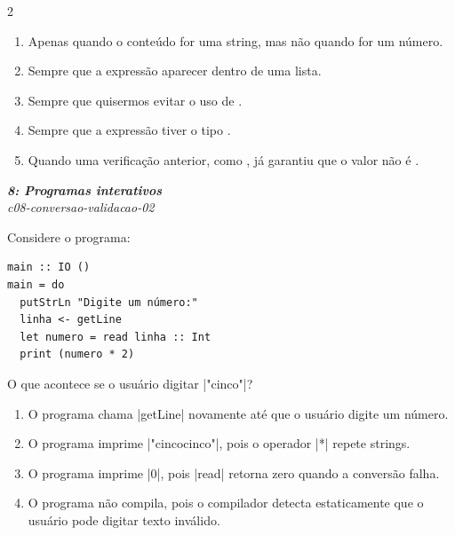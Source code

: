 \documentclass[a4paper,10pt,brazil]{article}
\begin{document}
\begin{multicols}{2}
\begin{enumerate}
  \item Apenas quando o conteúdo for uma string, mas não quando for um número.

  \item Sempre que a expressão aparecer dentro de uma lista.

  \item Sempre que quisermos evitar o uso de .

  \item Sempre que a expressão tiver o tipo .

  \item Quando uma verificação anterior, como , já garantiu que o valor não é .


\end{enumerate}

\begin{flushright}
  \footnotesize
  \textit{\textbf{8: Programas interativos}}\\
  \textit{c08-conversao-validacao-02}\\

\end{flushright}
Considere o programa:

\begin{verbatim}
main :: IO ()
main = do
  putStrLn "Digite um número:"
  linha <- getLine
  let numero = read linha :: Int
  print (numero * 2)
\end{verbatim}

O que acontece se o usuário digitar \haskellinline|"cinco"|?

\begin{enumerate}
  \item O programa chama \haskellinline|getLine| novamente até que o usuário digite um número.

  \item O programa imprime \haskellinline|"cincocinco"|, pois o operador \haskellinline|*| repete strings.

  \item O programa imprime \haskellinline|0|, pois \haskellinline|read| retorna zero quando a conversão falha.

  \item O programa não compila, pois o compilador detecta estaticamente que o usuário pode digitar texto inválido.


\end{enumerate}
\end{multicols}
\end{document}
